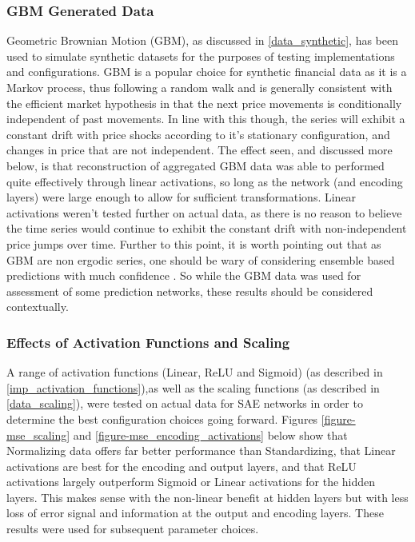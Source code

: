 \documentclass[a4paper,11pt,oneside]{article}
\theoremstyle{plain}
\theoremstyle{definition}
\begin{document}
	\subsubsection{GBM Generated Data}\label{results_gbm_data}
	
	Geometric Brownian Motion (GBM), as discussed in \ref{data_synthetic}, has been used to simulate synthetic datasets for the purposes of testing implementations and configurations. GBM is a popular choice for synthetic financial data as it is a Markov process, thus following a random walk and is generally consistent with the efficient market hypothesis in that the next price movements is conditionally independent of past movements. In line with this though, the series will exhibit a constant drift with price shocks according to it's stationary configuration, and changes in price that are not independent. The effect seen, and discussed more below, is that reconstruction of aggregated GBM data was able to performed quite effectively through linear activations, so long as the network (and encoding layers) were large enough to allow for sufficient transformations. Linear activations weren't tested further on actual data, as there is no reason to believe the time series would continue to exhibit the constant drift with non-independent price jumps over time. Further to this point, it is worth pointing out that as GBM are non ergodic series, one should be wary of considering ensemble based predictions with much confidence \cite{Peters}. So while the GBM data was used for assessment of some prediction networks, these results should be considered contextually.
	
	\subsubsection{Effects of Activation Functions and Scaling}\label{results_activations_scaling}
	
	A range of activation functions (Linear, ReLU and Sigmoid) (as described in \ref{imp_activation_functions}),as well as the scaling functions (as described in \ref{data_scaling}), were tested on actual data for SAE networks in order to determine the best configuration choices going forward. Figures \ref{figure-mse_scaling} and \ref{figure-mse_encoding_activations} below show that Normalizing data offers far better performance than Standardizing, that Linear activations are best for the encoding and output layers, and that ReLU activations largely outperform Sigmoid or Linear activations for the hidden layers. This makes sense with the non-linear benefit at hidden layers but with less loss of error signal and information at the output and encoding layers. These results were used for subsequent parameter choices.
	
\end{document}
